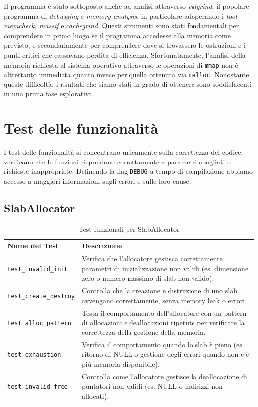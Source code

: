 Il programma è stato sottoposto anche ad analisi attraverso \textit{valgrind}, il popolare programma di \textit{debugging} e \textit{memory analysis}, in particolare adoperando i \textit{tool} \textit{memcheck, massif} e \textit{cachegrind}. Questi strumenti sono stati fondamentali per comprendere in primo luogo se il programma accedesse alla memoria come previsto, e secondariamente per comprendere dove si trovassero le ostruzioni e i punti critici che causavano perdita di efficienza. Sfortunatamente, l'analisi della memoria richiesta al sistema operativo attraverso le operazioni di \texttt{mmap} non è altrettanto immediata quanto invece per quella ottenuta via \texttt{malloc}. Nonostante queste difficoltà, i risultati che siamo stati in grado di ottenere sono soddisfacenti in una prima fase esplorativa.

\section{Test delle funzionalità}

I test delle funzionalità si concentrano unicamente sulla correttezza del codice: verificano che le funzioni rispondano correttamente a parametri sbagliati o richieste inappropriate. Definendo la flag \texttt{DEBUG} a tempo di compilazione abbiamo accesso a maggiori informazioni sugli errori e sulle loro cause. 

\subsection{SlabAllocator}
\begin{table}[H]
\centering
\begin{tabularx}{\textwidth}{|l|X|}
\hline
\textbf{Nome del Test} & \textbf{Descrizione} \\
\hline
\texttt{test\_invalid\_init} & Verifica che l'allocatore gestisca correttamente parametri di inizializzazione non validi (es. dimensione zero o numero massimo di slab non valido). \\
\hline
\texttt{test\_create\_destroy} & Controlla che la creazione e distruzione di uno slab avvengano correttamente, senza memory leak o errori. \\
\hline
\texttt{test\_alloc\_pattern} & Testa il comportamento dell'allocatore con un pattern di allocazioni e deallocazioni ripetute per verificare la correttezza della gestione della memoria. \\
\hline
\texttt{test\_exhaustion} & Verifica il comportamento quando lo slab è pieno (es. ritorno di NULL o gestione degli errori quando non c'è più memoria disponibile). \\
\hline
\texttt{test\_invalid\_free} & Controlla come l'allocatore gestisce la deallocazione di puntatori non validi (es. NULL o indirizzi non allocati). \\
\hline
\end{tabularx}
\caption{Test funzionali per SlabAllocator}
\end{table}

